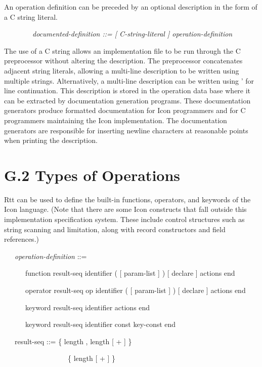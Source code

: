 An operation definition can be preceded by an optional description in
the form of a C string literal.

{\ttfamily\mdseries
\ \ \ \ \ \ \ \ \textit{documented-definition ::= [ C-string-literal ] operation-definition}}


The use of a C string allows an implementation file to be run through
the C preprocessor without altering the description. The preprocessor
concatenates adjacent string literals, allowing a multi-line
description to be written using multiple strings. Alternatively, a
multi-line description can be written using {\textasciigrave}' for
line continuation. This description is stored in the operation data
base where it can be extracted by documentation generation
programs. These documentation generators produce formatted
documentation for Icon programmers and for C programmers maintaining
the Icon implementation. The documentation generators are responsible
for inserting newline characters at reasonable points when printing
the description.

\section[G.2 Types of Operations ]{G.2 Types of Operations }

Rtt can be used to define the built-in functions, operators, and
keywords of the Icon language. (Note that there are some Icon
constructs that fall outside this implementation specification
system. These include control structures such as string scanning and
limitation, along with record constructors and field references.)

{\ttfamily\mdseries
\ \ \ \textit{operation-definition} ::=}

{\ttfamily\mdseries
\ \ \ \ \ \ function result-seq identifier ( [ param-list ] ) [ declare ] actions end {\textbar}}

{\ttfamily\mdseries
\ \ \ \ \ \ operator result-seq op identifier ( [ param-list ] ) [ declare ] actions end {\textbar}}

{\ttfamily\mdseries
\ \ \ \ \ \ keyword result-seq identifier actions end {\textbar}}

{\ttfamily\mdseries
\ \ \ \ \ \ keyword result-seq identifier const key-const end}

{\ttfamily\mdseries
\ \ \ result-seq ::= \{ length , length [ + ] \} {\textbar}}

{\ttfamily\mdseries
\ \ \ \ \ \ \ \ \ \ \ \ \ \ \ \ \ \ \{ length [ + ] \} {\textbar}}


